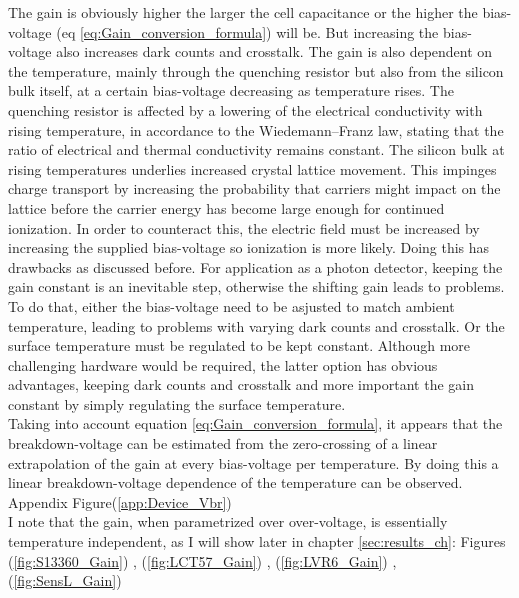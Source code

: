 \documentclass[12pt,article,type=msc,colorback,accentcolor=tud9c]{tudthesis}
\begin{document}
The gain is obviously higher the larger the cell capacitance or the higher the bias-voltage (eq \ref{eq:Gain_conversion_formula}) will be. But increasing the bias-voltage also increases dark counts and crosstalk. 
The gain is also dependent on the temperature, mainly through the quenching resistor but also from the silicon bulk itself, at a certain bias-voltage decreasing as temperature rises. The quenching resistor is affected by a lowering of the electrical conductivity with rising temperature, in accordance to the Wiedemann–Franz law, stating that the ratio of electrical and thermal conductivity remains constant. The silicon bulk at rising temperatures underlies increased crystal lattice movement. This impinges charge transport by increasing the probability that carriers might impact on the lattice before the carrier energy has become large enough for continued ionization. In order to counteract this, the electric field must be increased by increasing the supplied bias-voltage so ionization is more likely. Doing this has drawbacks as discussed before. For application as a photon detector, keeping the gain constant is an inevitable step, otherwise the shifting gain leads to problems. To do that, either the bias-voltage need to be asjusted to match ambient temperature, leading to problems with varying dark counts and crosstalk. Or the surface temperature must be regulated to be kept constant. Although more challenging hardware would be required, the latter option has obvious advantages, keeping dark counts and crosstalk and more important the gain constant by simply regulating the surface temperature.\\
Taking into account equation \ref{eq:Gain_conversion_formula}, it appears that the breakdown-voltage can be estimated from the zero-crossing of a linear extrapolation of the gain at every bias-voltage per temperature. By doing this a linear breakdown-voltage dependence of the temperature can be observed. Appendix Figure(\ref{app:Device_Vbr})\\
I note that the gain, when parametrized over over-voltage, is essentially temperature independent, as I will show later in chapter {\ref{sec:results_ch}}: Figures (\ref{fig:S13360_Gain}) , (\ref{fig:LCT57_Gain}) , (\ref{fig:LVR6_Gain}) , (\ref{fig:SensL_Gain})\\
\end{document}
